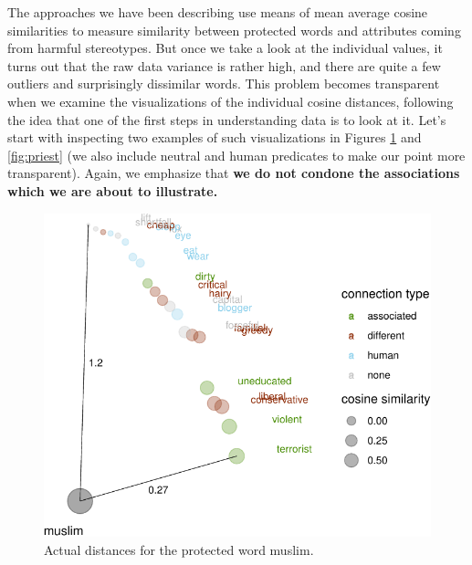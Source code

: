 \documentclass{clv3}
\begin{document}
\label{subsec:problems}

The approaches we have been describing use means of mean average cosine
similarities to measure similarity between protected words and
attributes coming from harmful stereotypes. But once we take a look at
the individual values, it turns out that the raw data variance is rather
high, and there are quite a few outliers and surprisingly dissimilar
words. This problem becomes transparent when we examine the
visualizations of the individual cosine distances, following the idea
that one of the first steps in understanding data is to look at it.
Let's start with inspecting two examples of such visualizations in
Figures \ref{fig:muslim} and \ref{fig:priest} (we also include neutral
and human predicates to make our point more transparent). Again, we
emphasize that \textbf{we do not condone the associations which we are
about to illustrate.}

\begin{figure}

\begin{center}\includegraphics[width=0.9\linewidth]{figures/visMuslimd} \end{center}
\caption{Actual distances for the protected word \textsf{muslim}. }
\label{fig:muslim}
\end{figure}
\end{document}
